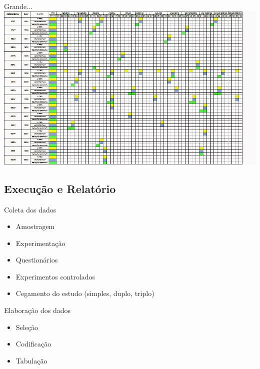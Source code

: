 \documentclass{beamer}
\begin{document}
\begin{frame}{Grande...}
  \includegraphics[width=\textwidth]{Etapas/cronograma-3}
\end{frame}



\subsection{Execução e Relatório}

\begin{frame}{Coleta dos dados}
  \begin{itemize}
    \footnotesize
  \item Amostragem
    \bigskip
  \item Experimentação
    \bigskip
  \item Questionários
    \bigskip
  \item Experimentos controlados
    \bigskip
  \item Cegamento do estudo (simples, duplo, triplo)
  \end{itemize}
\end{frame}

\begin{frame}{Elaboração dos dados}
  \begin{itemize}
    \footnotesize
  \item Seleção
    \bigskip
  \item Codificação
    \bigskip
  \item Tabulação
  \end{itemize}
\end{frame}
\end{document}
